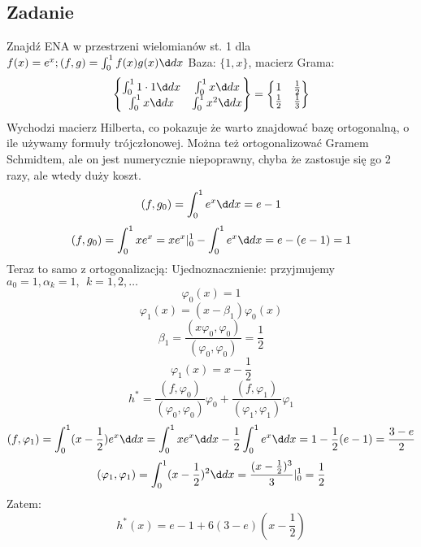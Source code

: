 \documentclass{article}
\begin{document}
\subsection{Zadanie}
Znajdź ENA w przestrzeni wielomianów st. 1 dla $f(x)=e^x; (f,g)=\int_{0}^{1}f(x)g(x)\d d x$
Baza: $\{1, x\}$, macierz Grama:
$$
\begin{Bmatrix}
\int_{0}^1 1\cdot 1\d d x & \int_{0}^1 x\d d x\\
\int_{0}^1 x\d d x&\int_{0}^1 x^2\d d x
\end{Bmatrix}
=
\begin{Bmatrix}
1 & \frac12\\
\frac12&\frac13
\end{Bmatrix}
$$
Wychodzi macierz Hilberta, co pokazuje że warto znajdować bazę ortogonalną, o ile używamy formuły trójczłonowej.
Można też ortogonalizować Gramem Schmidtem, ale on jest numerycznie niepoprawny, chyba że zastosuje się go 2 razy, ale wtedy duży koszt.
$$ (f, g_0)=\int_{0}^1e^x\d dx=e-1 $$
$$ (f, g_0)=\int_0^1xe^x=xe^x|^1_0-\int_{0}^1e^x\d dx=e-(e-1)=1$$
Teraz to samo z ortogonalizacją:
Ujednoznacznienie: przyjmujemy $ a_0=1,\alpha_k=1,\ \ k=1,2,\dots $
$$\varphi_0(x)=1$$
$$\varphi_1(x)=(x-\beta_1)\varphi_0(x)$$
$$\beta_1=\frac{(x\varphi_{0},\varphi_{0})}{(\varphi_{0},\varphi_{0})}=\frac12$$
$$\varphi_1(x)=x-\frac{1}{2}$$
$$h^*=\frac{(f,\varphi_0)}{(\varphi_0,\varphi_0)}\varphi_0+\frac{(f,\varphi_1)}{(\varphi_1,\varphi_1)}\varphi_1 $$
$$(f,\varphi_1)=\int_{0}^1(x-\frac12)e^x\d dx=\int_{0}^1xe^x\d dx-\frac12\int_{0}^1e^x\d dx=1-\frac12(e-1)=\frac{3-e}{2}$$
$$(\varphi_1,\varphi_1)=\int_{0}^{1}(x-\frac12)^2\d dx=\frac{(x-\frac12)^3}{3}|^1_0=\frac12$$
Zatem:
$$h^*(x)=e-1 + 6(3-e)(x-\frac12)$$
\end{document}
